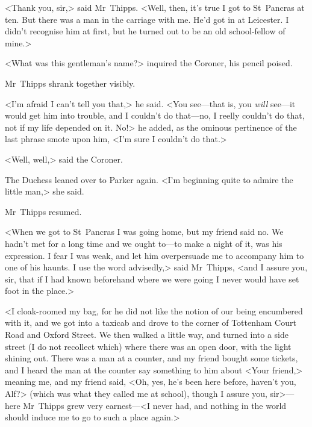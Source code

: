 <Thank you, sir,> said Mr~Thipps. <Well, then, it's true I got to St~Pancras at ten. But there was a man in the carriage with me. He'd got in at Leicester. I didn't recognise him at first, but he turned out to be an old school-fellow of mine.>

<What was this gentleman's name?> inquired the Coroner, his pencil poised.

Mr~Thipps shrank together visibly.

<I'm afraid I can't tell you that,> he said. <You see—that is, you \emph{will} see—it would get him into trouble, and I couldn't do that—no, I reelly couldn't do that, not if my life depended on it. No!> he added, as the ominous pertinence of the last phrase smote upon him, <I'm sure I couldn't do that.>

<Well, well,> said the Coroner.

The Duchess leaned over to Parker again. <I'm beginning quite to admire the little man,> she said.

Mr~Thipps resumed.

<When we got to St~Pancras I was going home, but my friend said no. We hadn't met for a long time and we ought to—to make a night of it, was his expression. I fear I was weak, and let him overpersuade me to accompany him to one of his haunts. I use the word advisedly,> said Mr~Thipps, <and I assure you, sir, that if I had known beforehand where we were going I never would have set foot in the place.>

<I cloak-roomed my bag, for he did not like the notion of our being encumbered with it, and we got into a taxicab and drove to the corner of Tottenham Court Road and Oxford Street. We then walked a little way, and turned into a side street (I do not recollect which) where there was an open door, with the light shining out. There was a man at a counter, and my friend bought some tickets, and I heard the man at the counter say something to him about <Your friend,> meaning me, and my friend said, <Oh, yes, he's been here before, haven't you, Alf?> (which was what they called me at school), though I assure you, sir>—here Mr~Thipps grew very earnest—<I never had, and nothing in the world should induce me to go to such a place again.>

